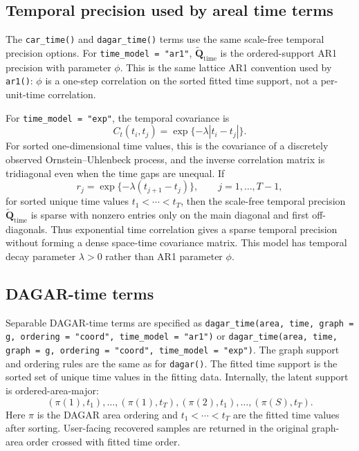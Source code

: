 \documentclass[11pt]{article}
\newcommand{\bQ}{\bm{Q}}
\begin{document}
\subsection{Temporal precision used by areal time terms}

The \texttt{car\_time()} and \texttt{dagar\_time()} terms use the same scale-free temporal precision options. For \texttt{time\_model = "ar1"}, $\widetilde{\bQ}_{\mathrm{time}}$ is the ordered-support AR1 precision with parameter $\phi$. This is the same lattice AR1 convention used by \texttt{ar1()}: $\phi$ is a one-step correlation on the sorted fitted time support, not a per-unit-time correlation.

For \texttt{time\_model = "exp"}, the temporal covariance is
\begin{equation}
  C_t(t_i,t_j) = \exp\{-\lambda |t_i-t_j|\}.
\end{equation}
For sorted one-dimensional time values, this is the covariance of a discretely observed Ornstein--Uhlenbeck process, and the inverse correlation matrix is tridiagonal even when the time gaps are unequal. If
\begin{equation}
  r_j = \exp\{-\lambda(t_{j+1}-t_j)\},
  \qquad j=1,\ldots,T-1,
\end{equation}
for sorted unique time values $t_1<\cdots<t_T$, then the scale-free temporal precision $\widetilde{\bQ}_{\mathrm{time}}$ is sparse with nonzero entries only on the main diagonal and first off-diagonals. Thus exponential time correlation gives a sparse temporal precision without forming a dense space-time covariance matrix. This model has temporal decay parameter $\lambda>0$ rather than AR1 parameter $\phi$.

\subsection{DAGAR-time terms}

Separable DAGAR-time terms are specified as \texttt{dagar\_time(area, time, graph = g, ordering = "coord", time\_model = "ar1")} or \texttt{dagar\_time(area, time, graph = g, ordering = "coord", time\_model = "exp")}. The graph support and ordering rules are the same as for \texttt{dagar()}. The fitted time support is the sorted set of unique time values in the fitting data. Internally, the latent support is ordered-area-major:
\begin{equation}
  (\pi(1),t_1),\ldots,(\pi(1),t_T),
  (\pi(2),t_1),\ldots,(\pi(S),t_T).
\end{equation}
Here $\pi$ is the DAGAR area ordering and $t_1<\cdots<t_T$ are the fitted time values after sorting. User-facing recovered samples are returned in the original graph-area order crossed with fitted time order.
\end{document}

